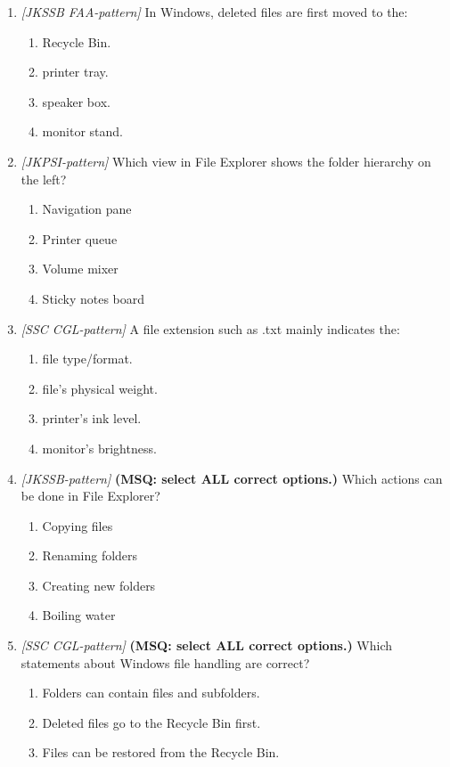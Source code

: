 \begin{enumerate}[label=\textbf{Q\arabic*.}, leftmargin=*]
\item \textit{[JKSSB FAA-pattern]} In Windows, deleted files are first moved to the:
  \begin{enumerate}[label=\Alph*.]
    \item Recycle Bin.
    \item printer tray.
    \item speaker box.
    \item monitor stand.
  \end{enumerate}
\item \textit{[JKPSI-pattern]} Which view in File Explorer shows the folder hierarchy on the left?
  \begin{enumerate}[label=\Alph*.]
    \item Navigation pane
    \item Printer queue
    \item Volume mixer
    \item Sticky notes board
  \end{enumerate}
\item \textit{[SSC CGL-pattern]} A file extension such as .txt mainly indicates the:
  \begin{enumerate}[label=\Alph*.]
    \item file type/format.
    \item file's physical weight.
    \item printer's ink level.
    \item monitor's brightness.
  \end{enumerate}
\item \textit{[JKSSB-pattern]} \textbf{(MSQ: select ALL correct options.)} Which actions can be done in File Explorer?
  \begin{enumerate}[label=\Alph*.]
    \item Copying files
    \item Renaming folders
    \item Creating new folders
    \item Boiling water
  \end{enumerate}
\item \textit{[SSC CGL-pattern]} \textbf{(MSQ: select ALL correct options.)} Which statements about Windows file handling are correct?
  \begin{enumerate}[label=\Alph*.]
    \item Folders can contain files and subfolders.
    \item Deleted files go to the Recycle Bin first.
    \item Files can be restored from the Recycle Bin.

\end{enumerate}
\end{enumerate}
